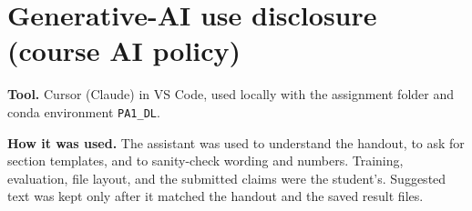 \newpage
\section*{Generative-AI use disclosure (course AI policy)}

\noindent\textbf{Tool.} Cursor (Claude) in VS Code, used locally with the assignment folder and conda environment \texttt{PA1\_DL}.

\noindent\textbf{How it was used.} The assistant was used to understand the handout, to ask for section templates, and to sanity-check wording and numbers. Training, evaluation, file layout, and the submitted claims were the student's. Suggested text was kept only after it matched the handout and the saved result files.

